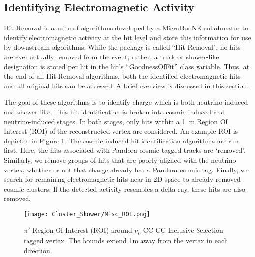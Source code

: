 \subsection{Identifying Electromagnetic Activity}

Hit Removal is a suite of algorithms developed by a MicroBooNE collaborator to identify electromagnetic activity at the hit level and store this information for use by downstream algorithms. While the package is called ``Hit Removal", no hits are ever actually removed from the event; rather, a track or shower-like designation is stored per hit in the hit's ``GoodnessOfFit'' class variable. Thus, at the end of all Hit Removal algorithms, both the identified electromagnetic hits and all original hits can be accessed. A brief overview is discussed in this section. %

\par The goal of these algorithms is to identify charge which is both neutrino-induced and shower-like. This hit-identification is broken into cosmic-induced and neutrino-induced stages.  In both stages, only hits within a 1~m Region Of Interest (ROI) of the reconstructed vertex are considered. An example ROI is depicted in Figure \ref{fig:roi}. The cosmic-induced hit identification algorithms are run first.  Here, the hits associated with Pandora cosmic-tagged tracks are `removed'.  Similarly, we remove groups of hits that are poorly aligned with the neutrino vertex, whether or not that charge already has a Pandora cosmic tag. Finally, we search for remaining electromagnetic hits near in 2D space to already-removed cosmic clusters. If the detected activity resembles a delta ray, these hits are also removed. 

\begin{figure}[h!]
\centering
\texttt{[image: Cluster\_Shower/Misc\_ROI.png]}
\caption{$\pi^0$ Region Of Interest (ROI) around $\nu_\mu$ CC CC Inclusive Selection tagged  vertex. The bounds extend 1m away from the vertex in each direction. }
\label{fig:roi}
\end{figure}

